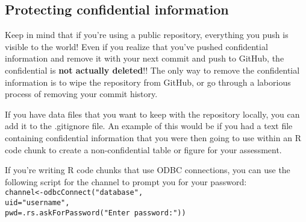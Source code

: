 \documentclass[12pt,]{article}
\begin{document}
\subsection{Protecting confidential
information}\label{protecting-confidential-information}

Keep in mind that if you're using a public repository, everything you
push is visible to the world! Even if you realize that you've pushed
confidential information and remove it with your next commit and push to
GitHub, the confidential is \textbf{not actually deleted}!! The only way
to remove the confidential information is to wipe the repository from
GitHub, or go through a laborious process of removing your commit
history.

If you have data files that you want to keep with the repository
locally, you can add it to the .gitignore file. An example of this would
be if you had a text file containing confidential information that you
were then going to use within an R code chunk to create a
non-confidential table or figure for your assessment.

If you're writing R code chunks that use ODBC connections, you can use
the following script for the channel to prompt you for your password:\\
\texttt{channel\textless{}-odbcConnect("database",}\\
\hspace*{0.333em}\hspace*{0.333em}\hspace*{0.333em}\hspace*{0.333em}\hspace*{0.333em}\hspace*{0.333em}\hspace*{0.333em}\hspace*{0.333em}\hspace*{0.333em}\hspace*{0.333em}\hspace*{0.333em}\texttt{uid="username",}\\
\hspace*{0.333em}\hspace*{0.333em}\hspace*{0.333em}\hspace*{0.333em}\hspace*{0.333em}\hspace*{0.333em}\hspace*{0.333em}\hspace*{0.333em}\hspace*{0.333em}\hspace*{0.333em}\hspace*{0.333em}\texttt{pwd=.rs.askForPassword("Enter\ password:"))}
\end{document}
